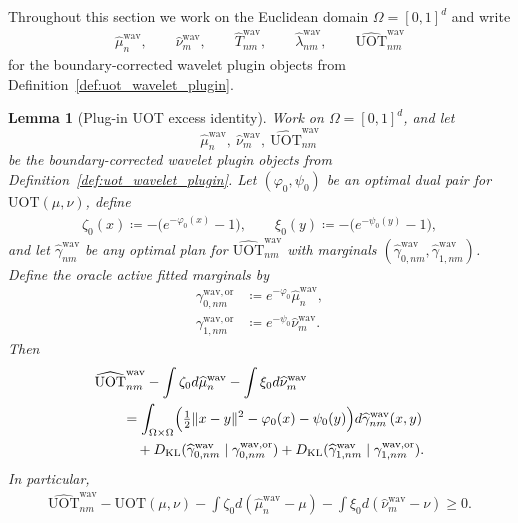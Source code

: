 \documentclass[11pt,reqno]{amsart}
\newtheorem{lemma}[theorem]{Lemma}
\theoremstyle{definition}
\newcommand{\KL}{\mathrm{KL}}
\renewcommand{\hat}{\widehat}
\begin{document}
Throughout this section we work on the Euclidean domain $\Omega=[0,1]^d$ and write
\begin{align*}
    \hat\mu_n^{\mathrm{wav}},\qquad \hat\nu_m^{\mathrm{wav}},\qquad \hat T_{nm}^{\mathrm{wav}},\qquad \hat\lambda_{nm}^{\mathrm{wav}},\qquad \widehat{\mathrm{UOT}}_{nm}^{\mathrm{wav}}
\end{align*}
for the boundary-corrected wavelet plugin objects from Definition~\ref{def:uot_wavelet_plugin}.

\begin{lemma}[Plug-in UOT excess identity]
\label{lem:uot_plugin_exact_excess}
Work on $\Omega=[0,1]^d$, and let
\[
    \hat\mu_n^{\mathrm{wav}},\ \hat\nu_m^{\mathrm{wav}},\ \widehat{\mathrm{UOT}}_{nm}^{\mathrm{wav}}
\]
be the boundary-corrected wavelet plugin objects from Definition~\ref{def:uot_wavelet_plugin}.
Let $(\varphi_0,\psi_0)$ be an optimal dual pair for $\mathrm{UOT}(\mu,\nu)$, define
\begin{align*}
    \zeta_0(x) \coloneqq -\bigl(e^{-\varphi_0(x)}-1\bigr),
    \qquad
    \xi_0(y) \coloneqq -\bigl(e^{-\psi_0(y)}-1\bigr),
\end{align*}
and let $\hat\gamma_{nm}^{\mathrm{wav}}$ be any optimal plan for $\widehat{\mathrm{UOT}}_{nm}^{\mathrm{wav}}$ with marginals $(\hat\gamma_{0,nm}^{\mathrm{wav}},\hat\gamma_{1,nm}^{\mathrm{wav}})$.
Define the oracle active fitted marginals by
\begin{align*}
    \gamma_{0,nm}^{\mathrm{wav},\mathrm{or}}
    &\coloneqq e^{-\varphi_0}\hat\mu_n^{\mathrm{wav}},
    \\
    \gamma_{1,nm}^{\mathrm{wav},\mathrm{or}}
    &\coloneqq e^{-\psi_0}\hat\nu_m^{\mathrm{wav}}.
\end{align*}
Then
\begin{equation}
\label{eq:uot_plugin_exact_excess}
\begin{aligned}
&\widehat{\mathrm{UOT}}_{nm}^{\mathrm{wav}}
- \int \zeta_0 d\hat\mu_n^{\mathrm{wav}}
- \int \xi_0 d\hat\nu_m^{\mathrm{wav}} \\
&\qquad=
\int_{\Omega\times\Omega}
\Bigl(
\tfrac{1}{2}\|x-y\|^2-\varphi_0(x)-\psi_0(y)
\Bigr)
  d\hat\gamma_{nm}^{\mathrm{wav}}(x,y) \\
&\qquad\quad
+ {D_\KL}(\hat\gamma_{0,nm}^{\mathrm{wav}}\mid \gamma_{0,nm}^{\mathrm{wav},\mathrm{or}})
+ {D_\KL}(\hat\gamma_{1,nm}^{\mathrm{wav}}\mid \gamma_{1,nm}^{\mathrm{wav},\mathrm{or}}).
\end{aligned}
\end{equation}
In particular,
\begin{align}
\label{eq:uot_plugin_exact_excess_nonnegative}
    \widehat{\mathrm{UOT}}_{nm}^{\mathrm{wav}}
    - \mathrm{UOT}(\mu,\nu)
    - \int \zeta_0 d(\hat\mu_n^{\mathrm{wav}}-\mu)
    - \int \xi_0 d(\hat\nu_m^{\mathrm{wav}}-\nu)
    \ge 0.
\end{align}
\end{lemma}
\end{document}
